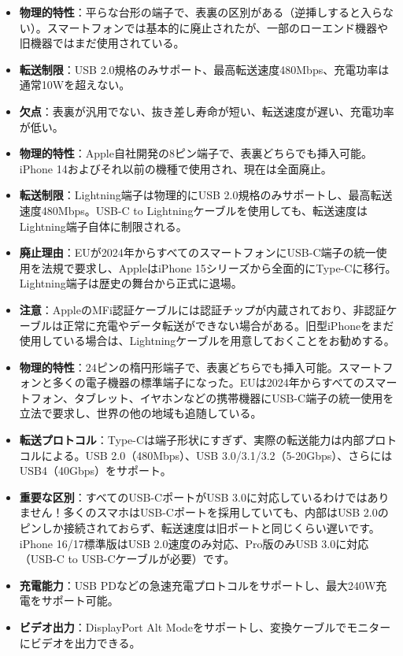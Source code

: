 
\begin{itemize}
  \item \textbf{物理的特性}：平らな台形の端子で、表裏の区別がある（逆挿しすると入らない）。スマートフォンでは基本的に廃止されたが、一部のローエンド機器や旧機器ではまだ使用されている。
  \item \textbf{転送制限}：USB 2.0規格のみサポート、最高転送速度480Mbps、充電功率は通常10Wを超えない。
  \item \textbf{欠点}：表裏が汎用でない、抜き差し寿命が短い、転送速度が遅い、充電功率が低い。
\end{itemize}


\begin{itemize}
  \item \textbf{物理的特性}：Apple自社開発の8ピン端子で、表裏どちらでも挿入可能。iPhone 14およびそれ以前の機種で使用され、現在は全面廃止。
  \item \textbf{転送制限}：Lightning端子は物理的にUSB 2.0規格のみサポートし、最高転送速度480Mbps。USB-C to Lightningケーブルを使用しても、転送速度はLightning端子自体に制限される。
  \item \textbf{廃止理由}：EUが2024年からすべてのスマートフォンにUSB-C端子の統一使用を法規で要求し、AppleはiPhone 15シリーズから全面的にType-Cに移行。Lightning端子は歴史の舞台から正式に退場。
  \item \textbf{注意}：AppleのMFi認証ケーブルには認証チップが内蔵されており、非認証ケーブルは正常に充電やデータ転送ができない場合がある。旧型iPhoneをまだ使用している場合は、Lightningケーブルを用意しておくことをお勧めする。
\end{itemize}


\begin{itemize}
  \item \textbf{物理的特性}：24ピンの楕円形端子で、表裏どちらでも挿入可能。スマートフォンと多くの電子機器の標準端子になった。EUは2024年からすべてのスマートフォン、タブレット、イヤホンなどの携帯機器にUSB-C端子の統一使用を立法で要求し、世界の他の地域も追随している。
  \item \textbf{転送プロトコル}：Type-Cは端子形状にすぎず、実際の転送能力は内部プロトコルによる。USB 2.0（480Mbps）、USB 3.0/3.1/3.2（5-20Gbps）、さらにはUSB4（40Gbps）をサポート。
  \item \textbf{重要な区別}：すべてのUSB-CポートがUSB 3.0に対応しているわけではありません！多くのスマホはUSB-Cポートを採用していても、内部はUSB 2.0のピンしか接続されておらず、転送速度は旧ポートと同じくらい遅いです。iPhone 16/17標準版はUSB 2.0速度のみ対応、Pro版のみUSB 3.0に対応（USB-C to USB-Cケーブルが必要）です。
  \item \textbf{充電能力}：USB PDなどの急速充電プロトコルをサポートし、最大240W充電をサポート可能。
  \item \textbf{ビデオ出力}：DisplayPort Alt Modeをサポートし、変換ケーブルでモニターにビデオを出力できる。
\end{itemize}

